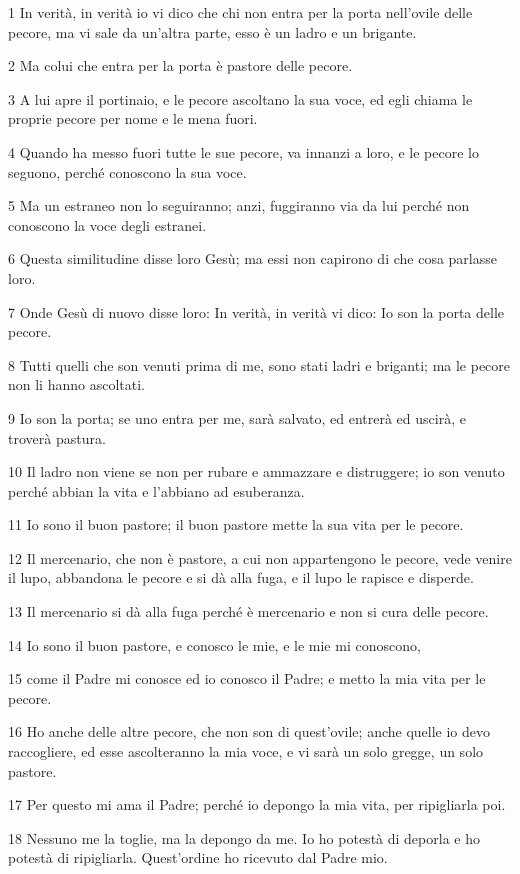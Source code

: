 \par 1 In verità, in verità io vi dico che chi non entra per la porta nell'ovile delle pecore, ma vi sale da un'altra parte, esso è un ladro e un brigante.
\par 2 Ma colui che entra per la porta è pastore delle pecore.
\par 3 A lui apre il portinaio, e le pecore ascoltano la sua voce, ed egli chiama le proprie pecore per nome e le mena fuori.
\par 4 Quando ha messo fuori tutte le sue pecore, va innanzi a loro, e le pecore lo seguono, perché conoscono la sua voce.
\par 5 Ma un estraneo non lo seguiranno; anzi, fuggiranno via da lui perché non conoscono la voce degli estranei.
\par 6 Questa similitudine disse loro Gesù; ma essi non capirono di che cosa parlasse loro.
\par 7 Onde Gesù di nuovo disse loro: In verità, in verità vi dico: Io son la porta delle pecore.
\par 8 Tutti quelli che son venuti prima di me, sono stati ladri e briganti; ma le pecore non li hanno ascoltati.
\par 9 Io son la porta; se uno entra per me, sarà salvato, ed entrerà ed uscirà, e troverà pastura.
\par 10 Il ladro non viene se non per rubare e ammazzare e distruggere; io son venuto perché abbian la vita e l'abbiano ad esuberanza.
\par 11 Io sono il buon pastore; il buon pastore mette la sua vita per le pecore.
\par 12 Il mercenario, che non è pastore, a cui non appartengono le pecore, vede venire il lupo, abbandona le pecore e si dà alla fuga, e il lupo le rapisce e disperde.
\par 13 Il mercenario si dà alla fuga perché è mercenario e non si cura delle pecore.
\par 14 Io sono il buon pastore, e conosco le mie, e le mie mi conoscono,
\par 15 come il Padre mi conosce ed io conosco il Padre; e metto la mia vita per le pecore.
\par 16 Ho anche delle altre pecore, che non son di quest'ovile; anche quelle io devo raccogliere, ed esse ascolteranno la mia voce, e vi sarà un solo gregge, un solo pastore.
\par 17 Per questo mi ama il Padre; perché io depongo la mia vita, per ripigliarla poi.
\par 18 Nessuno me la toglie, ma la depongo da me. Io ho potestà di deporla e ho potestà di ripigliarla. Quest'ordine ho ricevuto dal Padre mio.
